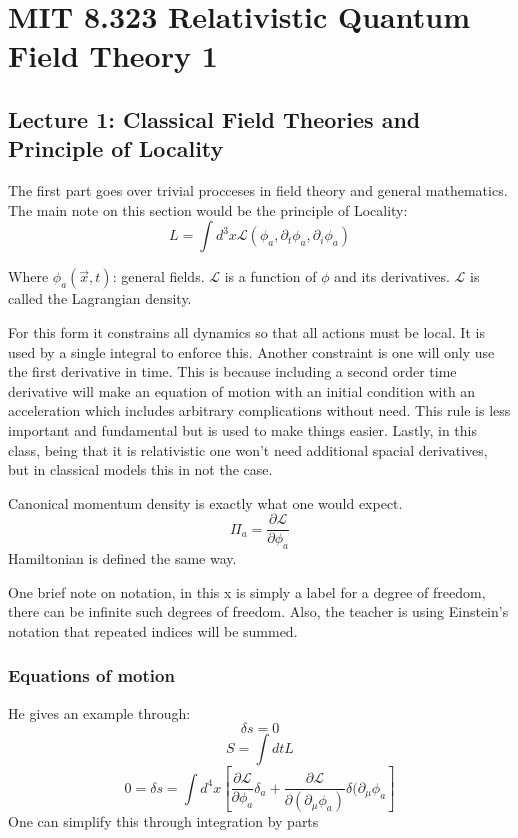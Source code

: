 \section{MIT 8.323 Relativistic Quantum Field Theory 1}

\subsection{Lecture 1: Classical Field Theories and Principle of Locality}
The first part goes over trivial procceses in field theory and general mathematics. The main note on this section would be the principle of Locality:
\[
L = \int d^3 x \mathcal{L} \left(\phi_a , \partial_t \phi_a , \partial_i \phi_a  \right)
  \]

  Where $\phi_a(\vec{x}, t)$: general fields.
$\mathcal{L}$ is a function of $\phi$ and its derivatives. $\mathcal{L}$ is called the Lagrangian density.

For this form it constrains all dynamics so that all actions must be local. It is used by a single integral to enforce this. Another constraint is one will only use the first derivative in time. This is because including a second order time derivative will make an equation of motion with an initial condition with an acceleration which includes arbitrary complications without need. This rule is less important and fundamental but is used to make things easier. Lastly, in this class, being that it is relativistic one won't need additional spacial derivatives, but in classical models this in not the case.

Canonical momentum density is exactly what one would expect.
\[
\Pi_a = \frac{\partial \mathcal{L}}{\partial \phi_a}
  \]
  Hamiltonian is defined the same way.

  One brief note on notation, in this x is simply a label for a degree of freedom, there can be infinite such degrees of freedom. Also, the teacher is using Einstein's notation that repeated indices will be summed.


\subsubsection{Equations of motion}
He gives an example through:
\[
  \delta s = 0
\]
\[
S = \int dt L
  \]
\[
0 = \delta s = \int d^4 x \left[ \frac{\partial \mathcal{L}}{\partial \phi_a} \delta_a + \frac{\partial \mathcal{L}}{\partial(\partial_\mu \phi_a)} \delta(\partial_\mu \phi_a\right]
  \]
  One can simplify this through integration by parts

